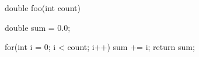 double foo(int count){
    double sum = 0.0;
    
    for(int i = 0; i < count; i++){
        sum += i;
    }
    return sum;
}